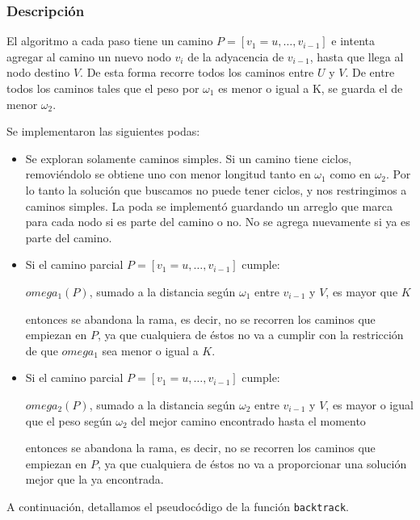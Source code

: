 \subsubsection{Descripción}

El algoritmo a cada paso tiene un camino $P = [v_1 = u, \dots, v_{i-1}]$ e intenta agregar al camino un nuevo nodo $v_i$ de la adyacencia de $v_{i-1}$, hasta que llega al nodo destino $V$. De esta forma recorre todos los caminos entre $U$ y $V$. De entre todos los caminos tales que el peso por $\omega_1$ es menor o igual a K, se guarda el de menor $\omega_2$.

Se implementaron las siguientes podas:

\begin{itemize}
    \item Se exploran solamente caminos simples. Si un camino tiene ciclos, removiéndolo se obtiene uno con menor longitud tanto en $\omega_1$ como en $\omega_2$. Por lo tanto la solución que buscamos no puede tener ciclos, y nos restringimos a caminos simples. La poda se implementó guardando un arreglo que marca para cada nodo si es parte del camino o no. No se agrega nuevamente si ya es parte del camino.
    \item Si el camino parcial $P = [v_1 = u, \dots, v_{i-1}]$ cumple:

        $omega_1(P)$, sumado a la distancia según $\omega_1$ entre $v_{i-1}$ y $V$, es mayor que $K$

entonces se abandona la rama, es decir, no se recorren los caminos que empiezan en $P$, ya que cualquiera de éstos no va a cumplir con la restricción de que $omega_1$ sea menor o igual a $K$.
    \item Si el camino parcial $P = [v_1 = u, \dots, v_{i-1}]$ cumple:

        $omega_2(P)$, sumado a la distancia según $\omega_2$ entre $v_{i-1}$ y $V$, es mayor o igual que el peso según $\omega_2$ del mejor camino encontrado hasta el momento

entonces se abandona la rama, es decir, no se recorren los caminos que empiezan en $P$, ya que cualquiera de éstos no va a proporcionar una solución mejor que la ya encontrada.
\end{itemize}

A continuaci\'on, detallamos el pseudoc\'odigo de la funci\'on \texttt{backtrack}.

